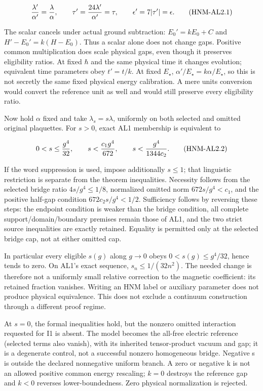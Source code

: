 \begin{equation}
{\lambda'\over\alpha'}={\lambda\over\alpha},\qquad
\tau'={24\lambda'\over\alpha'}=\tau,\qquad
\epsilon'=7|\tau'|=\epsilon.
\tag{HNM-AL2.1}
\label{r29:al2:eq1}
\end{equation}

The scalar cancels under actual ground subtraction: \(E_0'=kE_0+C\) and \(H'-E_0'=k(H-E_0)\). Thus a scalar alone does not change gaps. Positive common multiplication does scale physical gaps, even though it preserves eligibility ratios. At fixed \(\hbar\) and the same physical time it changes evolution; equivalent time parameters obey \(t'=t/k\). At fixed \(E_\star\), \(\alpha'/E_\star=k\alpha/E_\star\), so this is not secretly the same fixed physical energy calibration. A mere units conversion would convert the reference unit as well and would still preserve every eligibility ratio.

Now hold \(\alpha\) fixed and take \(\lambda_s=s \lambda\), uniformly on both selected and omitted original plaquettes. For \(s>0\), exact AL1 membership is equivalent to

\begin{equation}
0<s\le {g^4\over32},\qquad
s<{c_1g^4\over672},\qquad
s<{g^4\over1344c_2}.
\tag{HNM-AL2.2}
\label{r29:al2:eq2}
\end{equation}

If the word suppression is used, impose additionally \(s\le 1\); that linguistic restriction is separate from the theorem inequalities. Necessity follows from the selected bridge ratio \(4s/g^{4}\le 1/8\), normalized omitted norm \(672s/g^{4}<c_1\), and the positive half-gap condition \(672c_2 s/g^{4}<1/2\). Sufficiency follows by reversing these steps: the endpoint condition is weaker than the bridge condition, all complete support/domain/boundary premises remain those of AL1, and the two strict source inequalities are exactly retained. Equality is permitted only at the selected bridge cap, not at either omitted cap.

In particular every eligible \(s(g)\) along \(g\to 0\) obeys \(0<s(g)\le g^{4}/32\), hence tends to zero. On AL1's exact sequence, \(s_n\le 1/(32n^{2})\). The needed change is therefore not a uniformly small relative correction to the magnetic coefficient: its retained fraction vanishes. Writing an HNM label or auxiliary parameter does not produce physical equivalence. This does not exclude a continuum construction through a different proof regime.

At \(s=0\), the formal inequalities hold, but the nonzero omitted interaction requested for I1 is absent. The model becomes the all-free electric reference (selected terms also vanish), with its inherited tensor-product vacuum and gap; it is a degenerate control, not a successful nonzero homogeneous bridge. Negative s is outside the declared nonnegative uniform branch. A zero or negative k is not an allowed positive common energy rescaling; \(k=0\) destroys the reference gap and \(k<0\) reverses lower-boundedness. Zero physical normalization is rejected.

